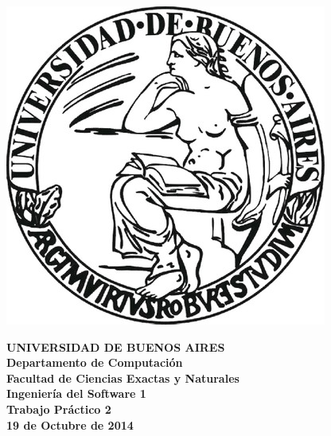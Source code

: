 \documentclass[a4paper]{article}
\begin{document}

\def\Materia{Ingenier\'ia del Software 1}
\def\Titulo{Trabajo Pr\'actico 2}
\def\Fecha{19 de Octubre de 2014}


\thispagestyle{empty}

\begin{center}
	\includegraphics[scale = 0.25]{logo_uba.jpg}
\end{center}

\vspace{5mm}

\begin{center}
	{\textbf{\large UNIVERSIDAD DE BUENOS AIRES}}\\[1.5em]
	{\textbf{\large Departamento de Computaci\'{o}n}}\\[1.5em]
    {\textbf{\large Facultad de Ciencias Exactas y Naturales}}\\
    \vspace{35mm}
    {\LARGE\textbf{\Materia}}\\[1em]    
    \vspace{15mm}
    {\Large \textbf{\Titulo}}\\[1em]
    \vspace{15mm}
    {\textbf{\Large \Fecha}}\\
    \vspace{15mm}
    \textbf{\tablaints}
\end{center}
\end{document}

